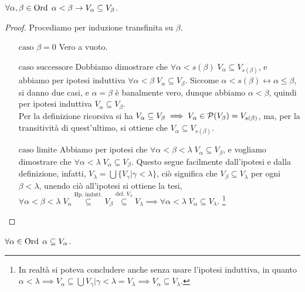 \begin{lemma}[``Ordinamento'' di $V_*$]
	$\forall \alpha, \beta \in \operatorname{Ord} \; \alpha < \beta \rightarrow V_\alpha \subseteq V_\beta$.
\end{lemma}

\begin{proof}
	Procediamo per induzione transfinita su $\beta$.
	\begin{itemize}
		\item[$\boxed{\text{caso $\beta = 0$}}$] Vero a vuoto.
		\item[$\boxed{\text{caso successore}}$] Dobbiamo dimostrare che $\forall \alpha < s(\beta) \; V_\alpha \subseteq V_{s(\beta)}$, e abbiamo per ipotesi induttiva $\forall \alpha < \beta \; V_\alpha \subseteq V_\beta$.
		Siccome $\alpha < s(\beta) \leftrightarrow \alpha \leq \beta$, si danno due casi, e $\alpha = \beta$ è banalmente vero, dunque abbiamo $\alpha < \beta$, quindi per ipotesi induttiva $V_\alpha \subseteq V_\beta$.\\
		Per la definizione ricorsiva si ha $V_\alpha \subseteq V_\beta \implies V_\alpha \in \mathcal{P}(V_\beta) = V_{s(\beta)}$, ma, per la transitività di quest'ultimo, si ottiene che $V_\alpha \subseteq V_{s(\beta)}$.
		\item[$\boxed{\text{caso limite}}$] Abbiamo per ipotesi che $\forall \alpha < \beta < \lambda \; V_\alpha \subseteq V_\beta$, e vogliamo dimostrare che $\forall \alpha < \lambda \; V_\alpha \subseteq V_\beta$. Questo segue facilmente dall'ipotesi e dalla definizione,
		infatti, $V_\lambda = \bigcup\{V_\gamma | \gamma < \lambda\}$, ciò significa che $V_\beta \subseteq V_\lambda$ per ogni $\beta < \lambda$, unendo ciò all'ipotesi si ottiene la tesi, $\forall \alpha < \beta < \lambda \; V_\alpha \overset{\text{Hp. indutt.}}{\subseteq} V_\beta \overset{\text{def. $V_\lambda$}}{\subseteq} V_\lambda \implies \forall \alpha < \lambda\; V_\alpha \subseteq V_\lambda$.
		\footnote{In realtà si poteva concludere anche senza usare l'ipotesi induttiva, in quanto $\alpha < \lambda \implies V_\alpha \subseteq \bigcup{V_\gamma | \gamma < \lambda} = V_\lambda \implies V_\alpha \subseteq V_\lambda$.}
	\end{itemize}
\end{proof}

\begin{lemma}
	$\forall \alpha \in \operatorname{Ord} \; \alpha \subseteq V_\alpha$.
\end{lemma}

